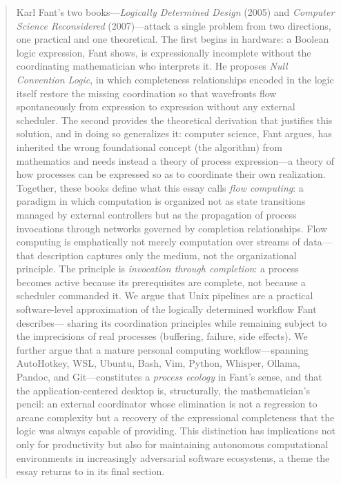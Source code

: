 \documentclass[12pt, a4paper]{article}
\begin{document}
\begin{abstract}
\noindent
Karl Fant's two books---\textit{Logically Determined Design} (2005)
and \textit{Computer Science Reconsidered} (2007)---attack a single
problem from two directions, one practical and one theoretical. The
first begins in hardware: a Boolean logic expression, Fant shows, is
expressionally incomplete without the coordinating mathematician who
interprets it. He proposes \emph{Null Convention Logic}, in which
completeness relationships encoded in the logic itself restore the
missing coordination so that wavefronts flow spontaneously from
expression to expression without any external scheduler. The second
provides the theoretical derivation that justifies this solution, and
in doing so generalizes it: computer science, Fant argues, has
inherited the wrong foundational concept (the algorithm) from
mathematics and needs instead a theory of process expression---a
theory of how processes can be expressed so as to coordinate their own
realization. Together, these books define what this essay calls
\emph{flow computing}: a paradigm in which computation is organized
not as state transitions managed by external controllers but as the
propagation of process invocations through networks governed by
completion relationships. Flow computing is emphatically not merely
computation over streams of data---that description captures only the
medium, not the organizational principle. The principle is
\emph{invocation through completion}: a process becomes active because
its prerequisites are complete, not because a scheduler commanded it.
We argue that Unix pipelines are a practical software-level
approximation of the logically determined workflow Fant describes---
sharing its coordination principles while remaining subject to the
imprecisions of real processes (buffering, failure, side effects). We
further argue that a mature personal computing workflow---spanning
AutoHotkey, WSL, Ubuntu, Bash, Vim, Python, Whisper, Ollama, Pandoc,
and Git---constitutes a \emph{process ecology} in Fant's sense, and
that the application-centered desktop is, structurally, the
mathematician's pencil: an external coordinator whose elimination is
not a regression to arcane complexity but a recovery of the
expressional completeness that the logic was always capable of
providing. This distinction has implications not only for
productivity but also for maintaining autonomous computational
environments in increasingly adversarial software ecosystems, a
theme the essay returns to in its final section.
\end{abstract}
\end{document}
